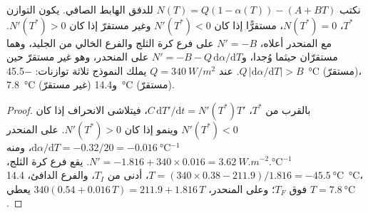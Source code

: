 \begin{proposition}\label{prop:b3:climate-models:three}
نكتب $N(T) = Q(1 - \alpha(T)) - (A + BT)$ للدفق الهابط الصافي.
يكون التوازن $T^*$، $N(T^*) = 0$، مستقرًّا إذا كان $N'(T^*) < 0$ وغير مستقرّ إذا كان
$N'(T^*) > 0$. مع المنحدر أعلاه، $N' = -B$ على فرع كرة الثلج
والفرع الخالي من الجليد، وهما مستقرّان حيثما وُجدا، و$N' = -B -
Q\,\mathrm d\alpha/\mathrm dT$ على المنحدر، وهو غير مستقرّ حين $Q\,
|\mathrm d\alpha/\mathrm dT| > B$. عند $Q = \qty{340}{W/m^2}$ يملك النموذج
ثلاثة توازنات: \qty{-45.5}{\celsius} (مستقرّ)، \qty{7.8}{\celsius}
(غير مستقرّ) و\qty{14.4}{\celsius} (مستقرّ).
\end{proposition}

\begin{proof}
بالقرب من $T^*$، $C\,\mathrm dT'/\mathrm dt = N'(T^*)T'$، فيتلاشى الانحراف
إذا كان $N'(T^*) < 0$ وينمو إذا كان $N'(T^*) > 0$. على المنحدر $\mathrm d\alpha/
\mathrm dT = -0.32/20 = \qty{-0.016}{\celsius^{-1}}$، ومنه $N' = -1.816 + 340
\times 0.016 = \qty{+3.62}{W.m^{-2}.\celsius^{-1}}$. يقع فرع كرة الثلج،
$T = (340\times0.38 - 211.9)/1.816 = \qty{-45.5}{\celsius}$، أدنى من
$T_I$، والفرع الدافئ، \qty{14.4}{\celsius}، فوق $T_F$؛ وعلى المنحدر،
$340(0.54 + 0.016\,T) = 211.9 + 1.816\,T$ يعطي $T = \qty{7.8}{\celsius}$.
\end{proof}

